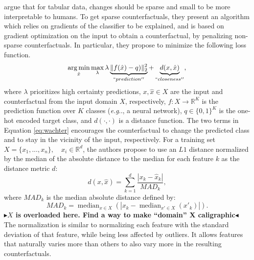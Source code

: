 \documentclass[11pt,a4paper,twoside,openright,final]{memoir}
\makeatletter
\DeclareMathOperator*{\argmin}{\arg\min}
\def\ifdraft{\ifdim\overfullrule>\z@
  \expandafter\@firstoftwo\else\expandafter\@secondoftwo\fi}
\newcommand{\todo}[1]{{
    \ifdraft{
        \color[rgb]{.5,0,0}\textbf{
            $\blacktriangleright$#1$\blacktriangleleft$
         }
    }{}}}
\DeclareRobustCommand\onedot{\futurelet\@let@token\@onedot}
\def\@onedot{\ifx\@let@token.\else.\null\fi\xspace}
\def\eg{\emph{e.g}\onedot} \def\Eg{\emph{E.g}\onedot}
\makeatother
\begin{document}
\citet{Wachter2017} argue that for tabular data, changes should be sparse and small to be more interpretable to humans.  %
To get sparse counterfactuals, they present an algorithm which relies on gradients of the classifier to be explained, and is based on gradient optimization on the input to obtain a counterfactual, by penalizing non-sparse counterfactuals.
In particular, they propose to  minimize the following loss function.
\begin{equation}\label{eq:wachter}
    \argmin_{\hat x} \max_\lambda 
    \lambda \underbrace{\|f(\hat x) - q)\|_2^2 }_{``prediction''}
    +       \underbrace{d(x, \hat x)}_{``closeness''},
\end{equation}
where $\lambda$ prioritizes high certainty predictions, $x, \hat x \in X$ are the input and counterfactual from the input domain $X$, respectively, $f: X \rightarrow \mathbb{R}^K$ is the prediction function over $K$ classes (\eg, a neural network), $q\in \{0, 1\}^K$ is the one-hot encoded target class, and $d(\cdot, \cdot)$ is a distance function.
The two terms in Equation \eqref{eq:wachter} encourages the counterfactual to change the predicted class and to stay in the vicinity of the input, respectively.
For a training set $X = \{ x_1, ..., x_n \}, \quad x_i \in \mathbb{R}^d$, the authors propose to use an $L1$ distance normalized by the median of the absolute distance to the median for each feature $k$ as the distance metric $d$:
\begin{equation}
    d(x, \hat x) = \sum_{k=1}^d \frac{|x_k - \hat x_k|}{MAD_k}, 
\end{equation}
where $MAD_k$ is the median absolute distance defined by:
\begin{equation}\label{eq:MAD}
    MAD_k = \operatorname{median}_{x\in X} (|x_k - \operatorname{median}_{x'\in X}(x'_k)|).
\end{equation}
\todo{$X$ is overloaded here. Find a way to make ``domain'' X caligraphic}
The normalization is similar to normalizing each feature with the standard deviation of that feature, while being less affected by outliers. 
It allows features that naturally varies more than others to also vary more in the resulting counterfactuals. 
\end{document}
